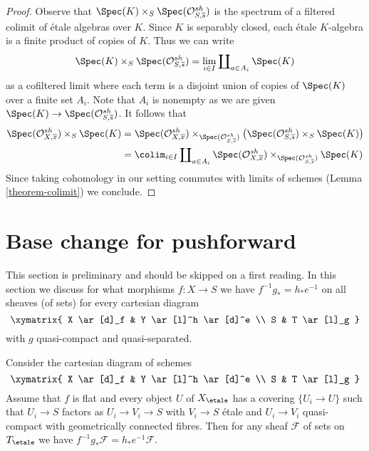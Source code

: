 \begin{proof}
Observe that $\Spec(K) \times_S \Spec(\mathcal{O}^{sh}_{S, \overline{s}})$
is the spectrum of a filtered colimit of \'etale algebras over $K$.
Since $K$ is separably closed, each \'etale $K$-algebra
is a finite product of copies of $K$. Thus we can write
$$
\Spec(K) \times_S \Spec(\mathcal{O}^{sh}_{S, \overline{s}}) =
\lim_{i \in I} \coprod\nolimits_{a \in A_i} \Spec(K)
$$
as a cofiltered limit where each term is a disjoint union
of copies of $\Spec(K)$ over a finite set $A_i$.
Note that $A_i$ is nonempty as we are given
$\Spec(K) \to \Spec(\mathcal{O}^{sh}_{S, \overline{s}})$.
It follows that
\begin{align*}
\Spec(\mathcal{O}^{sh}_{X, \overline{x}}) \times_S \Spec(K)
& =
\Spec(\mathcal{O}^{sh}_{X, \overline{x}})
\times_{\Spec(\mathcal{O}^{sh}_{S, \overline{s}})}
\left(
\Spec(\mathcal{O}^{sh}_{S, \overline{s}})
\times_S \Spec(K)\right) \\
& =
\colim_{i \in I} \coprod\nolimits_{a \in A_i}
\Spec(\mathcal{O}^{sh}_{X, \overline{x}})
\times_{\Spec(\mathcal{O}^{sh}_{S, \overline{s}})} \Spec(K)
\end{align*}
Since taking cohomology in our setting commutes with limits
of schemes (Lemma \ref{theorem-colimit}) we conclude.
\end{proof}





\section{Base change for pushforward}
\label{section-base-change-f-star}

\noindent
This section is preliminary and should be skipped on a first reading.
In this section we discuss for what morphisms $f : X \to S$ we have
$f^{-1}g_* = h_*e^{-1}$ on all sheaves (of sets) for every cartesian
diagram
$$
\xymatrix{
X \ar[d]_f & Y \ar[l]^h \ar[d]^e \\
S & T \ar[l]_g
}
$$
with $g$ quasi-compact and quasi-separated.

\begin{lemma}
\label{lemma-base-change-f-star-general}
Consider the cartesian diagram of schemes
$$
\xymatrix{
X \ar[d]_f & Y \ar[l]^h \ar[d]^e \\
S & T \ar[l]_g
}
$$
Assume that $f$ is flat and every object $U$ of $X_\etale$ has
a covering $\{U_i \to U\}$ such that $U_i \to S$
factors as $U_i \to V_i \to S$ with $V_i \to S$
\'etale and $U_i \to V_i$ quasi-compact with
geometrically connected fibres.
Then for any sheaf $\mathcal{F}$ of sets on $T_\etale$ we have
$f^{-1}g_*\mathcal{F} = h_*e^{-1}\mathcal{F}$.
\end{lemma}

